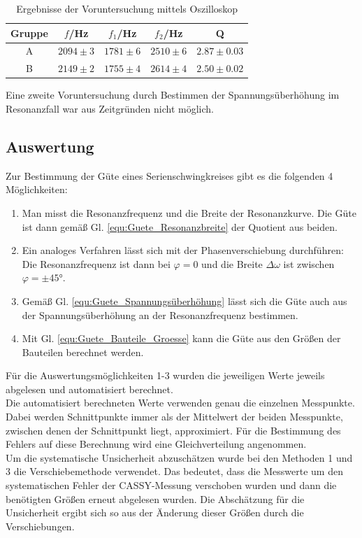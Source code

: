 \documentclass[12pt,a4paper]{article}
\begin{document}
\begin{table}
\centering
\begin{tabular}{|c|c|c|c|c|}
\hline
Gruppe & $f$/Hz & $f_1$/Hz & $f_2$/Hz & Q\\
\hline
A & $2094 \pm 3$ & $1781 \pm 6$ & $2510 \pm 6$ & $2.87 \pm 0.03$ \\
\hline
B & $2149 \pm 2$ & $1755 \pm 4$ & $2614 \pm 4$ & $2.50 \pm 0.02$\\
\hline
\end{tabular}
\caption{Ergebnisse der Voruntersuchung mittels Oszilloskop}
\label{tab:Voruntersuchung}
\end{table}


Eine zweite Voruntersuchung durch Bestimmen der Spannungsüberhöhung im Resonanzfall war aus Zeitgründen nicht möglich.

\subsection{Auswertung}
Zur Bestimmung der Güte eines Serienschwingkreises gibt es die folgenden 4 Möglichkeiten:
\begin{enumerate}
\item Man misst die Resonanzfrequenz und die Breite der Resonanzkurve. Die Güte ist dann gemäß Gl. \ref{equ:Guete_Resonanzbreite} der Quotient aus beiden.
\item Ein analoges Verfahren lässt sich mit der Phasenverschiebung durchführen: Die Resonanzfrequenz ist dann bei $\varphi = 0$ und die Breite $\Delta \omega$ ist zwischen $\varphi = \pm \ang{45}$.
\item Gemäß Gl. \ref{equ:Guete_Spannungsüberhöhung} lässt sich die Güte auch aus der Spannungsüberhöhung an der Resonanzfrequenz bestimmen.
\item Mit Gl. \ref{equ:Guete_Bauteile_Groesse} kann die Güte aus den Größen der Bauteilen berechnet werden.
\end{enumerate}

Für die Auswertungsmöglichkeiten 1-3 wurden die jeweiligen Werte jeweils abgelesen und automatisiert berechnet.\\
Die automatisiert berechneten Werte verwenden genau die einzelnen Messpunkte. Dabei werden Schnittpunkte immer als der Mittelwert der beiden Messpunkte, zwischen denen der Schnittpunkt liegt, approximiert. Für die Bestimmung des Fehlers auf diese Berechnung wird eine Gleichverteilung angenommen.\\

Um die systematische Unsicherheit abzuschätzen wurde bei den Methoden 1 und 3 die Verschiebemethode verwendet. Das bedeutet, dass die Messwerte um den systematischen Fehler der CASSY-Messung verschoben wurden und dann die benötigten Größen erneut abgelesen wurden. Die Abschätzung für die Unsicherheit ergibt sich so aus der Änderung dieser Größen durch die Verschiebungen.
\end{document}
